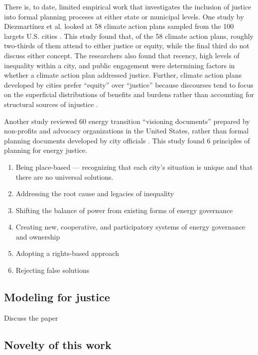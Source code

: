 There is, to date, limited empirical work that investigates the inclusion of
justice into formal planning proceses at either state or municipal levels. One
study by Diezmart\'inez et al. looked at 58 climate action plans sampled from
the 100 largets U.S. cities \cite{diezmartinez_us_2022}. This study found that,
of the 58 climate action plans, roughly two-thirds of them attend to either
justice or equity, while the final third do not discuss either concept. The
researchers also found that recency, high levels of inequality within a city,
and public engagement were determining factors in whether a climate action plan
addressed justice. Further, climate action plans developed by cities prefer
``equity'' over ``justice'' because discourses tend to focus on the superficial
distributions of benefits and burdens rather than accounting for structural
sources of injustice \cite{diezmartinez_us_2022}.

Another study reviewed 60 energy transition ``visioning documents'' prepared by
non-profits and advocacy organizations in the United States, rather than formal
planning documents developed by city officials \cite{elmallah_frontlining_2022}.
This study found 6 principles of planning for energy justice.
\begin{enumerate}
    \item Being place-based --- recognizing that each city's situation is unique
    and that there are no universal solutions.
    \item Addressing the root cause and legacies of inequality
    \item Shifting the balance of power from existing forms of energy governance
    \item Creating new, cooperative, and participatory systems of energy
    governance and ownership
    \item Adopting a rights-based approach
    \item Rejecting false solutions
\end{enumerate}

\subsection{Modeling for justice}

Discuss the paper \cite{lonergan_energy_2023}

\subsection{Novelty of this work}

